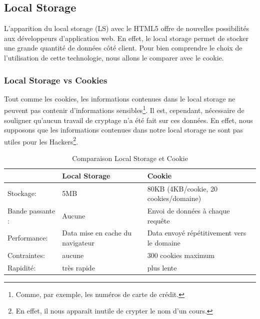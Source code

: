 \subsection{Local Storage}
L'apparition du local storage (LS) avec le HTML5 offre de nouvelles possibilités aux développeurs d'application web. En effet, le local storage permet de stocker une grande quantité de données côté client. Pour bien comprendre le choix de l'utilisation de cette technologie, nous allons le comparer avec le cookie.

\subsubsection{Local Storage vs Cookies}

Tout comme les cookies, les informations contenues dans le local storage ne peuvent pas contenir d'informations sensibles\footnote{Comme, par exemple, les numéros de carte de crédit.}. Il est, cependant, nécessaire de souligner qu'aucun travail de cryptage n'a été fait sur ces données. En effet, nous supposons que les informations contenues dans notre local storage ne sont pas utiles pour les Hackers\footnote{En effet, il nous apparaît inutile de crypter le nom d'un cours.}. 

\begin{table}[!h]
\begin{center}
\begin{tabular}{|l|l|l|}
  	\hline
   		& Local Storage & Cookie \\
  	\hline
  		Stockage: & 5MB & 80KB (4KB/cookie, 20 cookies/domaine) \\
	\hline  
		Bande passante : & Aucune & Envoi de données à chaque requête \\
  	\hline
  		Performance: & Data mise en cache du navigateur & Data envoyé répétitivement vers le domaine \\
  	\hline
  		Contraintes: & aucune & 300 cookies maximum \\
  	\hline
  		Rapidité: & très rapide & plus lente \\
  	\hline
\end{tabular}
\end{center}
\caption{Comparaison Local Storage et Cookie}
\label{local_storage}
\end{table}

